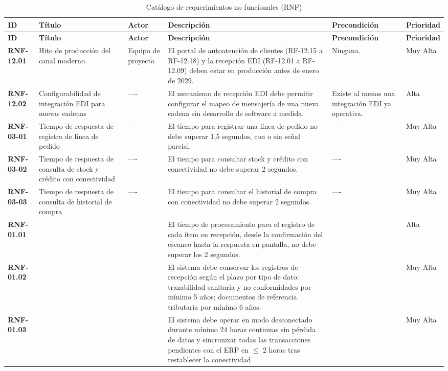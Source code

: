 ﻿\begin{longtable}{p{1.8cm} p{2.3cm} p{1.8cm} p{4.8cm} p{2.2cm} p{1.1cm}}
\caption{Cat\'alogo de requerimientos no funcionales (RNF)}\label{tab:rnf}\\
\toprule
\textbf{ID} & \textbf{T\'itulo} & \textbf{Actor} & \textbf{Descripci\'on} & \textbf{Precondici\'on} & \textbf{Prioridad} \\
\midrule
\endfirsthead
\toprule
\textbf{ID} & \textbf{T\'itulo} & \textbf{Actor} & \textbf{Descripci\'on} & \textbf{Precondici\'on} & \textbf{Prioridad} \\
\midrule
\endhead
\bottomrule
\endlastfoot
\textbf{RNF-12.01} & Hito de producción del canal moderno & Equipo de proyecto & El portal de autoatención de clientes (RF-12.15 a RF-12.18) y la recepción EDI (RF-12.01 a RF-12.09) deben estar en producción antes de enero de 2029. & Ninguna. & Muy Alta \\
\textbf{RNF-12.02} & Configurabilidad de integración EDI para nuevas cadenas & ---- & El mecanismo de recepción EDI debe permitir configurar el mapeo de mensajería de una nueva cadena sin desarrollo de software a medida. & Existe al menos una integración EDI ya operativa. & Alta \\
\textbf{RNF-03-01} & Tiempo de respuesta de registro de línea de pedido & ---- & El tiempo para registrar una línea de pedido no debe superar 1,5 segundos, con o sin señal parcial. & ---- & Muy Alta \\
\textbf{RNF-03-02} & Tiempo de respuesta de consulta de stock y crédito con conectividad & ---- & El tiempo para consultar stock y crédito con conectividad no debe superar 2 segundos. & ---- & Muy Alta \\
\textbf{RNF-03-03} & Tiempo de respuesta de consulta de historial de compra & ---- & El tiempo para consultar el historial de compra con conectividad no debe superar 2 segundos. & ---- & Muy Alta \\
\textbf{RNF-01.01} &  &  & El tiempo de procesamiento para el registro de cada ítem en recepción, desde la confirmación del escaneo hasta la respuesta en pantalla, no debe superar los 2 segundos. &  & Alta \\
\textbf{RNF-01.02} &  &  & El sistema debe conservar los registros de recepción según el plazo por tipo de dato: trazabilidad sanitaria y no conformidades por mínimo 5 años; documentos de referencia tributaria por mínimo 6 años. &  & Muy Alta \\
\textbf{RNF-01.03} &  &  & El sistema debe operar en modo desconectado durante mínimo 24 horas continuas sin pérdida de datos y sincronizar todas las transacciones pendientes con el ERP en $\le$ 2 horas tras restablecer la conectividad. &  & Muy Alta \\

\end{longtable}
